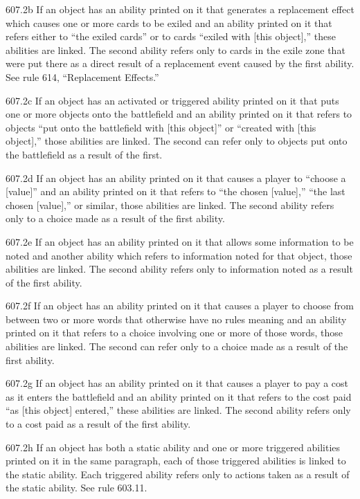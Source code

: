 607.2b If an object has an ability printed on it that generates a replacement effect which causes one or more cards to be exiled and an ability printed on it that refers either to “the exiled cards” or to cards “exiled with [this object],” these abilities are linked. The second ability refers only to cards in the exile zone that were put there as a direct result of a replacement event caused by the first ability. See rule 614, “Replacement Effects.”

607.2c If an object has an activated or triggered ability printed on it that puts one or more objects onto the battlefield and an ability printed on it that refers to objects “put onto the battlefield with [this object]” or “created with [this object],” those abilities are linked. The second can refer only to objects put onto the battlefield as a result of the first.

607.2d If an object has an ability printed on it that causes a player to “choose a [value]” and an ability printed on it that refers to “the chosen [value],” “the last chosen [value],” or similar, those abilities are linked. The second ability refers only to a choice made as a result of the first ability.

607.2e If an object has an ability printed on it that allows some information to be noted and another ability which refers to information noted for that object, those abilities are linked. The second ability refers only to information noted as a result of the first ability.

607.2f If an object has an ability printed on it that causes a player to choose from between two or more words that otherwise have no rules meaning and an ability printed on it that refers to a choice involving one or more of those words, those abilities are linked. The second can refer only to a choice made as a result of the first ability.

607.2g If an object has an ability printed on it that causes a player to pay a cost as it enters the battlefield and an ability printed on it that refers to the cost paid “as [this object] entered,” these abilities are linked. The second ability refers only to a cost paid as a result of the first ability.

607.2h If an object has both a static ability and one or more triggered abilities printed on it in the same paragraph, each of those triggered abilities is linked to the static ability. Each triggered ability refers only to actions taken as a result of the static ability. See rule 603.11.

